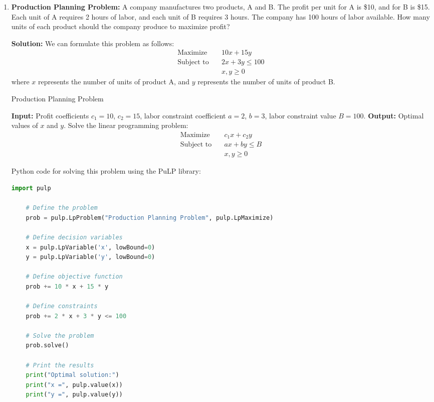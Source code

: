 \documentclass[12pt]{book} %
\begin{document}
\begin{enumerate}
    \item \textbf{Production Planning Problem:} A company manufactures two products, A and B. The profit per unit for A is \$10, and for B is \$15. Each unit of A requires 2 hours of labor, and each unit of B requires 3 hours. The company has 100 hours of labor available. How many units of each product should the company produce to maximize profit?
    
    \textbf{Solution:} We can formulate this problem as follows:
    \begin{align*}
        \text{Maximize} \quad & 10x + 15y \\
        \text{Subject to} \quad & 2x + 3y \leq 100 \\
        & x, y \geq 0
    \end{align*}
    where $x$ represents the number of units of product A, and $y$ represents the number of units of product B.
    
    \FloatBarrier
    \begin{algorithm}
    \caption{Production Planning Problem}
    \begin{algorithmic}[1]
    \State \textbf{Input:} Profit coefficients $c_1 = 10$, $c_2 = 15$, labor constraint coefficient $a = 2$, $b = 3$, labor constraint value $B = 100$.
    \State \textbf{Output:} Optimal values of $x$ and $y$.
    \State Solve the linear programming problem:
    \begin{align*}
        \text{Maximize} \quad & c_1x + c_2y \\
        \text{Subject to} \quad & ax + by \leq B \\
        & x, y \geq 0
    \end{align*}
    \end{algorithmic}
    \end{algorithm}
    \FloatBarrier
    
    Python code for solving this problem using the PuLP library:
    
    \begin{lstlisting}[language=Python]
    import pulp

    # Define the problem
    prob = pulp.LpProblem("Production Planning Problem", pulp.LpMaximize)

    # Define decision variables
    x = pulp.LpVariable('x', lowBound=0)
    y = pulp.LpVariable('y', lowBound=0)

    # Define objective function
    prob += 10 * x + 15 * y

    # Define constraints
    prob += 2 * x + 3 * y <= 100

    # Solve the problem
    prob.solve()

    # Print the results
    print("Optimal solution:")
    print("x =", pulp.value(x))
    print("y =", pulp.value(y))
    \end{lstlisting}
    
\end{enumerate}
\end{document}
